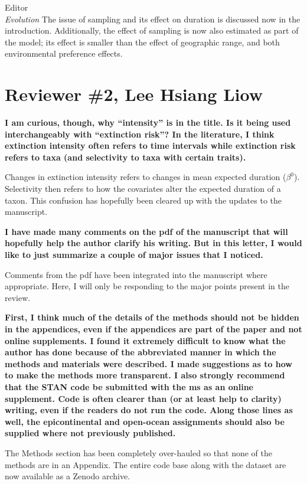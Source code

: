\documentclass{letter}
\begin{document}
\begin{letter}{Editor \\ \textit{Evolution}}
  The issue of sampling and its effect on duration is discussed now in the introduction. Additionally, the effect of sampling is now also estimated as part of the model; its effect is smaller than the effect of geographic range, and both environmental preference effects.


  \section{Reviewer \#2, Lee Hsiang Liow}
  \textbf{I am curious, though, why “intensity” is in the title. Is it being used interchangeably with “extinction risk”? In the literature, I think extinction intensity often refers to time intervals while extinction risk refers to taxa (and selectivity to taxa with certain traits).}

  Changes in extinction intensity refers to changes in mean expected duration (\(\beta^{0}\)). Selectivity then refers to how the covariates alter the expected duration of a taxon. This confusion has hopefully been cleared up with the updates to the manuscript.
  
  \textbf{I have made many comments on the pdf of the manuscript that will hopefully help the author clarify his writing. But in this letter, I would like to just summarize a couple of major issues that I noticed.}

  Comments from the pdf have been integrated into the manuscript where appropriate. Here, I will only be responding to the major points present in the review.
  
  \textbf{First, I think much of the details of the methods should not be hidden in the appendices, even if the appendices are part of the paper and not online supplements. I found it extremely difficult to know what the author has done because of the abbreviated manner in which the methods and materials were described. I made suggestions as to how to make the methods more transparent. I also strongly recommend that the STAN code be submitted with the ms as an online supplement. Code is often clearer than (or at least help to clarity) writing, even if the readers do not run the code. Along those lines as well, the epicontinental and open-ocean assignments should also be supplied where not previously published. }

  The Methods section has been completely over-hauled so that none of the methods are in an Appendix. The entire code base along with the dataset are now available as a Zenodo archive. 
  

\end{letter}
\end{document}
